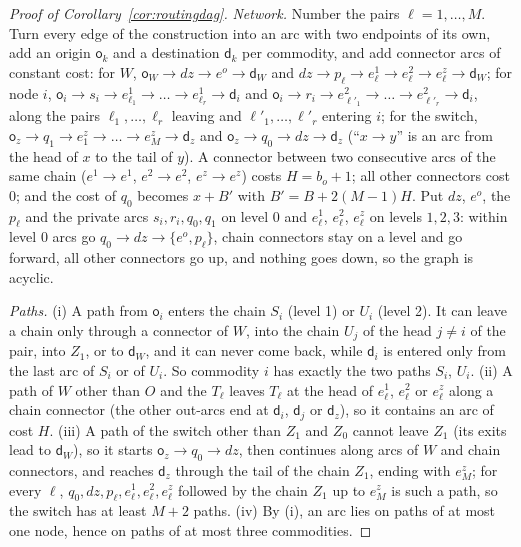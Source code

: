 \documentclass[11pt,a4paper]{article}
\theoremstyle{plain}
\theoremstyle{definition}
\theoremstyle{remark}
\begin{document}
\begin{proof}[Proof of Corollary~\ref{cor:routingdag}]
\emph{Network.} Number the pairs $\ell=1,\dots,M$. Turn every edge of the construction into an arc with two endpoints of its own, add an origin $\mathsf o_k$ and a destination $\mathsf d_k$ per commodity, and add connector arcs of constant cost: for $W$, $\mathsf o_W\to dz\to e^o\to\mathsf d_W$ and $dz\to p_\ell\to e^1_\ell\to e^2_\ell\to e^z_\ell\to\mathsf d_W$; for node $i$, $\mathsf o_i\to s_i\to e^1_{\ell_1}\to\dots\to e^1_{\ell_r}\to\mathsf d_i$ and $\mathsf o_i\to r_i\to e^2_{\ell'_1}\to\dots\to e^2_{\ell'_r}\to\mathsf d_i$, along the pairs $\ell_1,\dots,\ell_r$ leaving and $\ell'_1,\dots,\ell'_r$ entering $i$; for the switch, $\mathsf o_z\to q_1\to e^z_{1}\to\dots\to e^z_{M}\to\mathsf d_z$ and $\mathsf o_z\to q_0\to dz\to\mathsf d_z$ (``$x\to y$'' is an arc from the head of $x$ to the tail of $y$). A connector between two consecutive arcs of the same chain ($e^1\to e^1$, $e^2\to e^2$, $e^z\to e^z$) costs $H=b_o+1$; all other connectors cost $0$; and the cost of $q_0$ becomes $x+B'$ with $B'=B+2(M-1)H$. Put $dz$, $e^o$, the $p_\ell$ and the private arcs $s_i,r_i,q_0,q_1$ on level $0$ and $e^1_\ell$, $e^2_\ell$, $e^z_\ell$ on levels $1,2,3$: within level $0$ arcs go $q_0\to dz\to\{e^o,p_\ell\}$, chain connectors stay on a level and go forward, all other connectors go up, and nothing goes down, so the graph is acyclic.

\emph{Paths.} (i) A path from $\mathsf o_i$ enters the chain $S_i$ (level 1) or $U_i$ (level 2). It can leave a chain only through a connector of $W$, into the chain $U_j$ of the head $j\ne i$ of the pair, into $Z_1$, or to $\mathsf d_W$, and it can never come back, while $\mathsf d_i$ is entered only from the last arc of $S_i$ or of $U_i$. So commodity $i$ has exactly the two paths $S_i$, $U_i$. (ii) A path of $W$ other than $O$ and the $T_\ell$ leaves $T_\ell$ at the head of $e^1_\ell$, $e^2_\ell$ or $e^z_\ell$ along a chain connector (the other out-arcs end at $\mathsf d_i$, $\mathsf d_j$ or $\mathsf d_z$), so it contains an arc of cost $H$. (iii) A path of the switch other than $Z_1$ and $Z_0$ cannot leave $Z_1$ (its exits lead to $\mathsf d_W$), so it starts $\mathsf o_z\to q_0\to dz$, then continues along arcs of $W$ and chain connectors, and reaches $\mathsf d_z$ through the tail of the chain $Z_1$, ending with $e^z_M$; for every $\ell$, $q_0,dz,p_\ell,e^1_\ell,e^2_\ell,e^z_\ell$ followed by the chain $Z_1$ up to $e^z_M$ is such a path, so the switch has at least $M+2$ paths. (iv) By (i), an arc lies on paths of at most one node, hence on paths of at most three commodities.


\end{proof}
\end{document}
